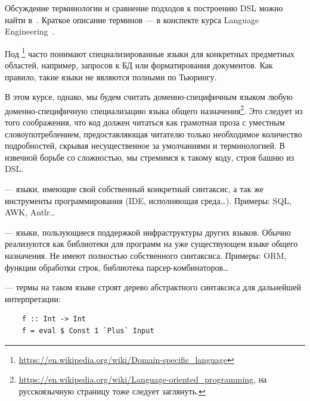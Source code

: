 Обсуждение терминологии и сравнение подходов к построению DSL можно найти в~\cite{gibbons2013functional}.
Краткое описание терминов --- в конспекте курса Language Engineering~\cite{languageEngineering}.

Под \footnote{\url{https://en.wikipedia.org/wiki/Domain-specific_language}} часто понимают специализированные языки для конкретных предметных областей, например, запросов к БД или форматирования документов.
Как правило, такие языки не являются полными по Тьюрингу.

В этом курсе, однако, мы будем считать доменно-специфичным языком любую доменно-специфичную специализацию языка общего назначения\footnote{\url{https://en.wikipedia.org/wiki/Language-oriented_programming}, на русскоязычную страницу тоже следует заглянуть.}.
Это следует из того соображения, что код должен читаться как грамотная проза с уместным словоупотреблением, предоставляющая читателю только необходимое количество подробностей, скрывая несущественное за умолчаниями и терминологией.
В извечной борьбе со сложностью, мы стремимся к такому коду, строя башню из DSL\@.

 --- языки, имеющие свой собственный конкретный синтаксис, а так же инструменты программирования (IDE, исполняющая среда\ldots).
Примеры: SQL, AWK, Antlr\ldots

 --- языки, пользующиеся поддержкой инфраструктуры других языков.
Обычно реализуются как библиотеки для программ на уже существующем языке общего назначения.
Не имеют полностью собственного синтаксиса.
Примеры: ORM, функции обработки строк, библиотека парсер-комбинаторов\ldots

 --- термы на таком языке строят дерево абстрактного синтаксиса для дальнейшей интерпретации:
\begin{verbatim}
    f :: Int -> Int
    f = eval $ Const 1 `Plus` Input
\end{verbatim}

%

